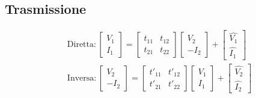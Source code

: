 \documentclass{article}
\begin{document}
\begin{minipage}[t]{.5\textwidth}
        \subsection*{Trasmissione}
        \vspace{-\baselineskip}

            \begin{align*}
                &\text{Diretta}:
                    \begin{bmatrix}
                        V_1\\
                        I_1
                    \end{bmatrix}
                    =
                    \begin{bmatrix}
                        t_{11} & t_{12}\\
                        t_{21} & t_{22}
                    \end{bmatrix}
                    \begin{bmatrix}
                        V_2\\
                        -I_2
                    \end{bmatrix}
                    +
                    \begin{bmatrix}
                        \hat{V_1}\\
                        \hat{I_1}
                    \end{bmatrix}\\
                &\text{Inversa}:
                    \begin{bmatrix}
                        V_2\\
                        -I_2
                    \end{bmatrix}
                    =
                    \begin{bmatrix}
                        t'_{11} & t'_{12}\\
                        t'_{21} & t'_{22}
                    \end{bmatrix}
                    \begin{bmatrix}
                        V_1\\
                        I_1
                    \end{bmatrix}
                    +
                    \begin{bmatrix}
                        \hat{V_2}\\
                        \hat{I_2}
                    \end{bmatrix}
            \end{align*}

    \end{minipage}
\end{document}
